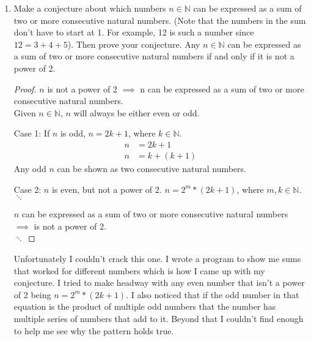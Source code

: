 \documentclass[12pt,a4paper,reqno,parskip=full]{amsart}
\numberwithin{equation}{section}
\theoremstyle{plain}
\theoremstyle{definition}
\begin{document}
\begin{enumerate}
\begin{proof}
          Assume $A$, $B$, $C$, and $D$ are all non-empty have no duplicate elements between them.
          \[|(A\times B)\cup(C\times D)| = |A| * |B| + |C| * |D|\]
          \begin{align*}
            |(A\cup C)\times(B\cup D)| & = (|A| + |C|) * (|B| + |D|)                     \\
                                       & = |A| * |B| + |C| * |D| + |A| * |D| + |B| * |C| \\
          \end{align*}
          \begin{align*}
            |A| * |B| + |C| * |D| & = |A| * |B| + |C| * |D| + |A| * |D| + |B| * |C| \\
            0                     & = |A| * |D| + |B| * |C|
          \end{align*}
          Clearly, the conjecture does not hold in this case.
        \end{proof}
  \item Make a conjecture about which numbers $n\in\mathbb{N}$ can be expressed as a sum of two or more consecutive natural numbers. (Note that the numbers in the sum don't have to start at 1. For example, 12 is such a number since $12=3+4+5$). Then prove your conjecture.
        \conjecture Any $n\in\mathbb{N}$ can be expressed as a sum of two or more consecutive natural numbers if and only if it is not a power of 2.
        \begin{proof}
          $n$ is not a power of 2 $\implies$
          n can be expressed as a sum of two or more consecutive natural numbers. \\
          Given $n\in\mathbb{N}$, $n$ will always be either even or odd.

          Case 1: If $n$ is odd, $n=2k+1$, where $k\in\mathbb{N}$.
          \begin{align*}
            n & = 2k + 1      \\
            n & = k + (k + 1)
          \end{align*}
          Any odd $n$ can be shown as two consecutive natural numbers.

          Case 2: $n$ is even, but not a power of 2. $n = 2^m * (2k + 1)$, where $m,k\in\mathbb{N}$.
          \\ $\ddots$

          $n$ can be expressed as a sum of two or more consecutive natural numbers
          $\implies$ is not a power of 2. \\
          $\ddots$
        \end{proof}

        Unfortunately I couldn't crack this one. I wrote a program to show me sums that worked for different numbers which is how I came up with my conjecture. I tried to make headway with any even number that isn't a power of 2 being $n = 2^m * (2k + 1)$. I also noticed that if the odd number in that equation is the product of multiple odd numbers that the number has multiple series of numbers that add to it. Beyond that I couldn't find enough to help me see why the pattern holds true.
\end{enumerate}
\end{document}
